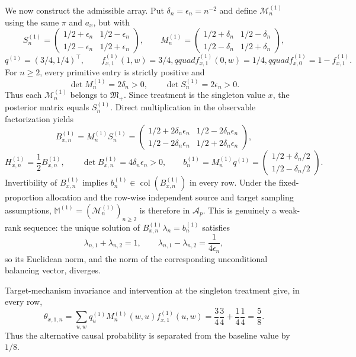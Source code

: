 We now construct the admissible array.  Put \(\delta_n=\epsilon_n=n^{-2}\) and define \(\mathcal M_n^{(1)}\) using the same \(\pi\) and \(a_x\), but with
\[
S_n^{(1)}=
\begin{pmatrix}
1/2+\epsilon_n&1/2-\epsilon_n\\
1/2-\epsilon_n&1/2+\epsilon_n
\end{pmatrix},\qquad
M_n^{(1)}=
\begin{pmatrix}
1/2+\delta_n&1/2-\delta_n\\
1/2-\delta_n&1/2+\delta_n
\end{pmatrix},
\]
\[
q^{(1)}=(3/4,1/4)^{\top},\qquad
f^{(1)}_{x,1}(1,w)=3/4,qquad
f^{(1)}_{x,1}(0,w)=1/4,qquad
f^{(1)}_{x,0}=1-f^{(1)}_{x,1}.
\]
For \(n\ge2\), every primitive entry is strictly positive and
\[
\det M_n^{(1)}=2\delta_n>0,
\qquad
\det S_n^{(1)}=2\epsilon_n>0.
\]
Thus each \(\mathcal M_n^{(1)}\) belongs to \(\mathfrak M_{+}\).  Since treatment is the singleton value \(x\), the posterior matrix equals \(S_n^{(1)}\).  Direct multiplication in the observable factorization yields
\[
B_{x,n}^{(1)}=M_n^{(1)}S_n^{(1)}=
\begin{pmatrix}
1/2+2\delta_n\epsilon_n&1/2-2\delta_n\epsilon_n\\
1/2-2\delta_n\epsilon_n&1/2+2\delta_n\epsilon_n
\end{pmatrix},
\]
\[
H_{x,n}^{(1)}=\frac12B_{x,n}^{(1)},\qquad
\det B_{x,n}^{(1)}=4\delta_n\epsilon_n>0,
\qquad
b_n^{(1)}=M_n^{(1)}q^{(1)}=
\begin{pmatrix}1/2+\delta_n/2\\1/2-\delta_n/2\end{pmatrix}.
\]
Invertibility of \(B_{x,n}^{(1)}\) implies
\(b_n^{(1)}\in\operatorname{col}(B_{x,n}^{(1)})\) in every row.  Under the fixed-proportion allocation and the row-wise independent source and target sampling assumptions, \(\mathbb M^{(1)}=(\mathcal M_n^{(1)})_{n\ge2}\) is therefore in \(\mathcal A_p\).  This is genuinely a weak-rank sequence: the unique solution of \(B_{x,n}^{(1)}\lambda_n=b_n^{(1)}\) satisfies
\[
\lambda_{n,1}+\lambda_{n,2}=1,
\qquad
\lambda_{n,1}-\lambda_{n,2}=\frac1{4\epsilon_n},
\]
so its Euclidean norm, and the norm of the corresponding unconditional balancing vector, diverges.

Target-mechanism invariance and intervention at the singleton treatment give, in every row,
\[
\theta_{x,1,n}
=\sum_{u,w}q_u^{(1)}M_n^{(1)}(w,u)f^{(1)}_{x,1}(u,w)
=\frac34\frac34+\frac14\frac14
=\frac58.
\]
Thus the alternative causal probability is separated from the baseline value by \(1/8\).

